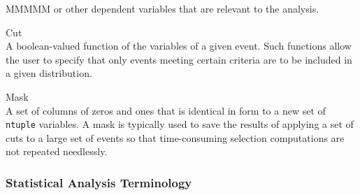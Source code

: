 \begin{DL}{MMMMM}
     or other dependent variables that are
     relevant to the analysis.
\item[Cut]\mbox{}\\
     A  boolean-valued function of the variables of a given event.
     Such functions allow the user to specify that only  events
     meeting certain criteria are to be included in a given distribution.
\item[Mask]\mbox{}\\
     A set of columns of zeros and ones that is identical in form
     to a new set of \verb|ntuple| variables.  A mask is typically
     used to save the results of applying a set of cuts to a large
     set of events so that
     time-consuming selection computations are not repeated needlessly.
\end{DL}

\subsubsection*{Statistical Analysis Terminology}

